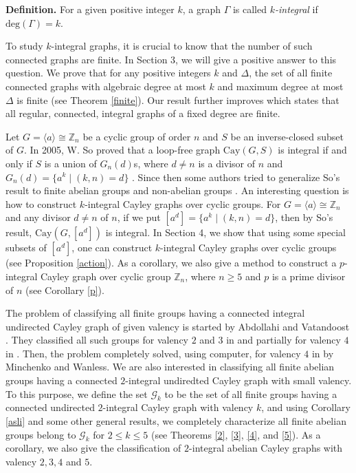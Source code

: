 \documentclass[12pt,a4paper]{article}
\def \leq {\leqslant}
\def \geq {\geqslant}
\begin{document}
	\medskip
	\noindent \textbf{Definition.} For a given  positive integer $k$, a  graph $\Gamma$ is called {\it $k$-integral} if $\mathrm{deg}(\Gamma)=k$.
	\medskip
	
	To study $k$-integral graphs, it is crucial to know that the number of such connected graphs are finite.	
	In Section 3, we will give a positive answer to this question.
	We prove that for any positive integers $k$ and $\Delta$, the set of all finite connected graphs with algebraic degree at most $k$ and maximum degree at most $\Delta$ is finite (see Theorem \ref{finite}).
	Our result further improves \cite[Theorem 2]{Cvet} which states that all regular, connected, integral graphs of a fixed degree are finite.
	
	
	
	
	
	
	Let $G=\langle a\rangle\cong\mathbb Z_n$ be a cyclic group of order $n$ and $S$ be an inverse-closed subset of $G$. 
	In 2005, W. So proved that a loop-free graph $\mathrm{Cay}(G,S)$ is integral if and only if $S$ is a union of $G_n(d)$s, where $d\neq n$ is a divisor of $n$ and $G_n(d)=\{a^k\mid (k,n)=d\}$ \cite[Theorem 7.1]{So}.
	Since then some authors tried to generalize So's result to finite abelian groups and non-abelian groups \cite{Alprin, AP,KS}.
	An interesting question is how to construct $k$-integral Cayley graphs over cyclic groups.
	For $G=\langle a\rangle\cong\mathbb Z_n$ and any divisor $d\neq n$ of $n$, if we put $[a^d]=\{a^k\mid (k,n)=d\}$, then by So's result, $\mathrm{Cay}(G,[a^d])$ is integral. 
	In Section 4, we show that using some special subsets of $[a^d]$, one can construct $k$-integral Cayley graphs over cyclic groups (see Proposition \ref{action}).
	As a corollary, we also give a method to construct a $p$-integral Cayley graph over cyclic group $\mathbb{Z}_n$, where $n\geq 5$ and $p$ is a prime divisor of $n$ (see Corollary \ref{p}).
	
	The problem of classifying all finite groups having a connected integral undirected Cayley graph of given valency is started by Abdollahi and Vatandoost \cite{AV}. They classified all such groups for valency $2$ and $3$ in \cite{AV} and partially for valency $4$ in \cite{AV-2}. Then, the problem completely solved, using computer, for valency $4$ in \cite{MW} by Minchenko and Wanless. We are also interested in classifying all finite abelian groups having a connected $2$-integral undiredted Cayley graph with small valency. To this purpose, we define the set $\mathcal{G}_k$ to be the set of all finite groups having a connected undirected $2$-integral Cayley graph with valency $k$, and using Corollary \ref{asli} and some other  general results, we completely characterize all finite abelian groups belong to $\mathcal{G}_k$ for $2\leq k\leq 5$ (see Theorems \ref{2}, \ref{3}, \ref{4}, and \ref{5}). As a corollary, we also give the classification of $2$-integral abelian Cayley graphs with valency $2,3,4$ and $5$.
	
\end{document}
